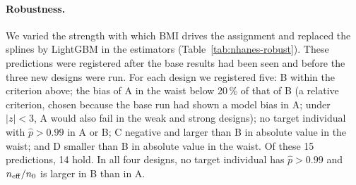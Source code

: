 \begin{table}[ht]
\centering
\caption{NHANES, robustness (200 replications each). Mean bias of the DR estimator in the waist (cm) and, in the last two columns, in blood pressure (BP). For B, the registered prediction and the $z$ of the deviation are given in parentheses.}\label{tab:nhanes-robust}
\end{table}

\paragraph{Robustness.} We varied the strength with which BMI drives the assignment and replaced the splines by LightGBM in the estimators (Table~\ref{tab:nhanes-robust}). These predictions were registered after the base results had been seen and before the three new designs were run. For each design we registered five: B within the criterion above; the bias of A in the waist below 20\,\% of that of B (a relative criterion, chosen because the base run had shown a model bias in A; under $|z|<3$, A would also fail in the weak and strong designs); no target individual with $\hat p>0.99$ in A or B; C negative and larger than B in absolute value in the waist; and D smaller than B in absolute value in the waist. Of these 15 predictions, 14 hold. In all four designs, no target individual has $\hat p>0.99$ and $n_{\mathrm{eff}}/n_0$ is larger in B than in A.

